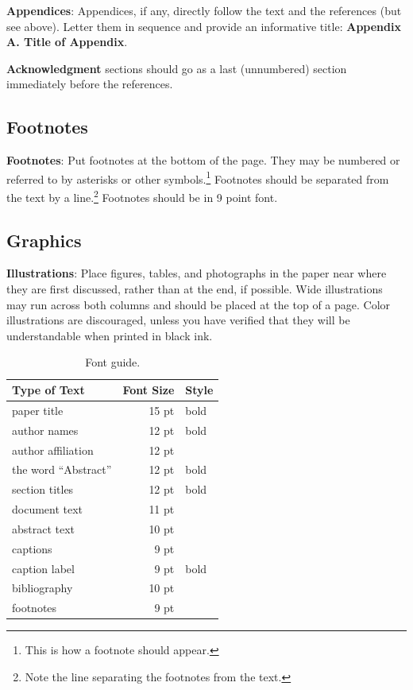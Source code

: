 \documentclass[11pt]{article}
\begin{document}
{\bf Appendices}: Appendices, if any, directly follow the text and the
references (but see above).  Letter them in sequence and provide an
informative title: {\bf Appendix A. Title of Appendix}.

\textbf{Acknowledgment} sections should go as a last (unnumbered) section immediately
before the references.  


\subsection{Footnotes}

{\bf Footnotes}: Put footnotes at the bottom of the page. They may
be numbered or referred to by asterisks or other
symbols.\footnote{This is how a footnote should appear.} Footnotes
should be separated from the text by a line.\footnote{Note the
line separating the footnotes from the text.}  Footnotes should be in 9 point font.

\subsection{Graphics}

{\bf Illustrations}: Place figures, tables, and photographs in the
paper near where they are first discussed, rather than at the end, if
possible.  Wide illustrations may run across both columns and should be placed at
the top of a page. Color illustrations are discouraged, unless you have verified that 
they will be understandable when printed in black ink. 

\begin{table}
\small
\centering
\begin{tabular}{|l|rl|}
\hline \bf Type of Text & \bf Font Size & \bf Style \\ \hline
paper title & 15 pt & bold \\
author names & 12 pt & bold \\
author affiliation & 12 pt & \\
the word ``Abstract'' & 12 pt & bold \\
section titles & 12 pt & bold \\
document text & 11 pt  &\\
abstract text & 10 pt & \\
captions & 9 pt & \\
caption label & 9 pt & bold \\
bibliography & 10 pt & \\
footnotes & 9 pt & \\
\hline
\end{tabular}
\caption{\label{font-table} Font guide.}
\end{table}
\end{document}
